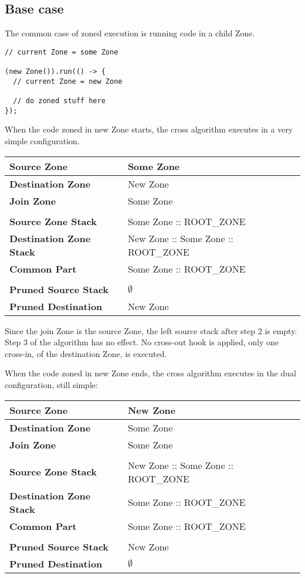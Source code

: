 \subsection*{Base case}

The common case of zoned execution is running code in a child Zone.

\begin{lstlisting}
// current Zone = some Zone

(new Zone()).run(() -> {
  // current Zone = new Zone

  // do zoned stuff here
});
\end{lstlisting}

When the code zoned in new Zone starts, the cross algorithm executes in a very simple configuration.

\begin{tabular}{| l | l |}
\hline
\textbf{Source Zone} & Some Zone
\\ \hline
\textbf{Destination Zone} & New Zone
\\ \hline
\textbf{Join Zone} & Some Zone
\\ \hline
\multicolumn{2}{l}{}
\\ \hline
\textbf{Source Zone Stack} & Some Zone :: ROOT\_ZONE
\\ \hline
\textbf{Destination Zone Stack} & New Zone :: Some Zone :: ROOT\_ZONE
\\ \hline
\textbf{Common Part} & Some Zone :: ROOT\_ZONE
\\ \hline
\multicolumn{2}{l}{}
\\ \hline
\textbf{Pruned Source Stack} & $\emptyset$
\\ \hline
\textbf{Pruned Destination} & New Zone
\\ \hline
\end{tabular}

Since the join Zone is the source Zone, the left source stack after step 2 is empty. Step 3 of the algorithm has no effect. No cross-out hook is applied, only one cross-in, of the destination Zone, is executed.

When the code zoned in new Zone ends, the cross algorithm executes in the dual configuration, still simple:

\begin{tabular}{| l | l |}
\hline
\textbf{Source Zone} & New Zone
\\ \hline
\textbf{Destination Zone} & Some Zone
\\ \hline
\textbf{Join Zone} & Some Zone
\\ \hline
\multicolumn{2}{l}{}
\\ \hline
\textbf{Source Zone Stack} &  New Zone :: Some Zone :: ROOT\_ZONE
\\ \hline
\textbf{Destination Zone Stack} & Some Zone :: ROOT\_ZONE
\\ \hline
\textbf{Common Part} & Some Zone :: ROOT\_ZONE
\\ \hline
\multicolumn{2}{l}{}
\\ \hline
\textbf{Pruned Source Stack} & New Zone
\\ \hline
\textbf{Pruned Destination} & $\emptyset$
\\ \hline
\end{tabular}

